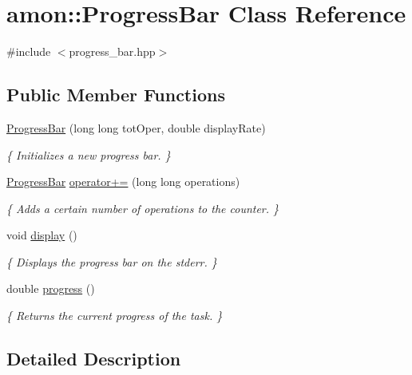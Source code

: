 \hypertarget{classamon_1_1_progress_bar}{\section{amon\-:\-:Progress\-Bar Class Reference}
\label{classamon_1_1_progress_bar}
}


{\ttfamily \#include $<$progress\-\_\-bar.\-hpp$>$}

\subsection*{Public Member Functions}
\begin{DoxyCompactItemize}
\item 
\hyperlink{classamon_1_1_progress_bar_a37469b1d7bd316bdbfa148321cec9bb7}{Progress\-Bar} (long long tot\-Oper, double display\-Rate)
\begin{DoxyCompactList}\small\item\em \{ Initializes a new progress bar. \} \end{DoxyCompactList}\item 
\hyperlink{classamon_1_1_progress_bar}{Progress\-Bar} \hyperlink{classamon_1_1_progress_bar_a2cb43fc40242d47254dfe6a0f3613be1}{operator+=} (long long operations)
\begin{DoxyCompactList}\small\item\em \{ Adds a certain number of operations to the counter. \} \end{DoxyCompactList}\item 
void \hyperlink{classamon_1_1_progress_bar_a16b5c543b03b1f452abd49bc5c63eb69}{display} ()
\begin{DoxyCompactList}\small\item\em \{ Displays the progress bar on the stderr. \} \end{DoxyCompactList}\item 
double \hyperlink{classamon_1_1_progress_bar_aad3a864a2d40756b2720c7725ad23599}{progress} ()
\begin{DoxyCompactList}\small\item\em \{ Returns the current progress of the task. \} \end{DoxyCompactList}\end{DoxyCompactItemize}


\subsection{Detailed Description}


